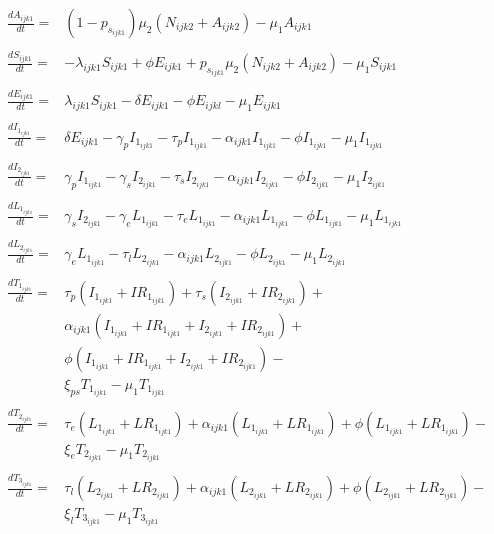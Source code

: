 \documentclass[a4paper]{article}
\begin{document}
\begin{equation*}\label{agecat1-1}
\begin{aligned}
  \frac{dA_{ijk1}}{dt}={} & (1-p_{s_{ijk1}} )\mu_2 (N_{ijk2} + A_{ijk2})  - \mu_1 A_{ijk1} 
    \\&\\
 \frac{dS_{ijk1}}{dt}={} & -\lambda_{ijk1} S_{ijk1}  + \phi E_{ijk1}  
 + p_{s_{ijk1}} \mu_2(N_{ijk2} + A_{ijk2}) - \mu_1 S_{ijk1}
  \\&\\
  \frac{dE_{ijk1}}{dt}={} & \lambda_{ijk1} S_{ijk1}  - \delta E_{ijk1} -\phi E_{ijkl} -\mu_1 E_{ijk1}
     \\&\\
  \frac{dI_{1_{ijk1}}}{dt}={} & \delta E_{ijk1} - \gamma_p I_{1_{ijk1}} - \tau_p I_{1_{ijk1}} - \alpha_{ijk1} I_{1_{ijk1}} -\phi I_{1_{ijk1}}  - \mu_1 I_{1_{ijk1}}
   \\&\\
  \frac{dI_{2_{ijk1}}}{dt}={} & \gamma_p I_{1_{ijk1}} - \gamma_s I_{2_{ijk1}} - \tau_s I_{2_{ijk1}} - \alpha_{ijk1} I_{2_{ijk1}} -\phi I_{2_{ijk1}}  - \mu_1 I_{2_{ijk1}}
     \\&\\
   \frac{dL_{1_{ijk1}}}{dt}={} & \gamma_s I_{2_{ijk1}} - \gamma_e L_{1_{ijk1}} - \tau_e L_{1_{ijk1}} - \alpha_{ijk1} L_{1_{ijk1}} -\phi L_{1_{ijk1}}  - \mu_1 L_{1_{ijk1}}
     \\&\\
    \frac{dL_{2_{ijk1}}}{dt}={} & \gamma_e L_{1_{ijk1}} - \tau_l L_{2_{ijk1}} - \alpha_{ijk1} L_{2_{ijk1}} -\phi L_{2_{ijk1}}   - \mu_1 L_{2_{ijk1}}
      \\&\\
    \frac{dT_{1_{ijk1}}}{dt}={} & \tau_p (I_{1_{ijk1}} + IR_{1_{ijk1}} ) + \tau_s (I_{2_{ijk1}} + IR_{2_{ijk1}}  ) + \\
    & \alpha_{ijk1} (I_{1_{ijk1}} + IR_{1_{ijk1}} + I_{2_{ijk1}} + IR_{2_{ijk1}}) + \\
    & \phi (I_{1_{ijk1}} + IR_{1_{ijk1}} + I_{2_{ijk1}} + IR_{2_{ijk1}}) - \\ 
    & \xi_{ps} T_{1_{ijk1}} - \mu_1 T_{1_{ijk1}}
     \\&\\
    \frac{dT_{2_{ijk1}}}{dt}={} & \tau_e (L_{1_{ijk1}} + LR_{1_{ijk1}} )  + \alpha_{ijk1} (L_{1_{ijk1}} + LR_{1_{ijk1}} ) + \phi (L_{1_{ijk1}} + LR_{1_{ijk1}} ) - \\
    & \xi_e T_{2_{ijk1}} - \mu_1 T_{2_{ijk1}}
     \\&\\
    \frac{dT_{3_{ijk1}}}{dt}={} & \tau_l (L_{2_{ijk1}} + LR_{2_{ijk1}}  ) + \alpha_{ijk1} (L_{2_{ijk1}} + LR_{2_{ijk1}} ) + \phi (L_{2_{ijk1}} + LR_{2_{ijk1}} ) - \\
    & \xi_l T_{3_{ijk1}} - \mu_1 T_{3_{ijk1}}
 \end{aligned}
 	\end{equation*}
 
\end{document}
